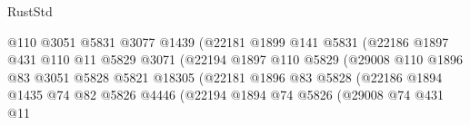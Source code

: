 \begin{lexlean}{RustStd}
\begin{coremodule}
                                          @110
                                          @3051
                                          @5831
                                          @3077
                                          @1439
                                          (@22181
                                            @1899
                                            @141
                                            @5831
                                            (@22186
                                              @1897
                                              @431
                                              @110
                                              @11
                                              @5829
                                              @3071
                                              (@22194
                                                @1897
                                                @110
                                                @5829
                                                (@29008
                                                  @110
                                                  @1896
                                                  @83
                                                  @3051
                                                  @5828
                                                  @5821
                                                  @18305
                                                  (@22181
                                                    @1896
                                                    @83
                                                    @5828
                                                    (@22186
                                                      @1894
                                                      @1435
                                                      @74
                                                      @82
                                                      @5826
                                                      @4446
                                                      (@22194
                                                        @1894
                                                        @74
                                                        @5826
                                                        (@29008
                                                          @74
                                                          @431
                                                          @11

\end{coremodule}
\end{lexlean}
